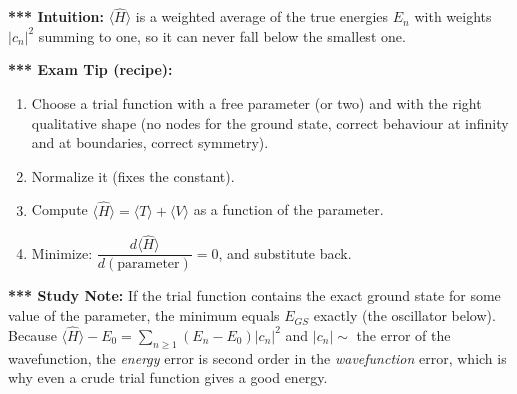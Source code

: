 \documentclass[11pt,a4paper]{article}
\begin{document}
\textbf{*** Intuition:} $\langle\hat H\rangle$ is a weighted average of the true energies $E_n$ with weights $|c_n|^2$ summing to one, so it can never fall below the smallest one.

\textbf{*** Exam Tip (recipe):}
\begin{enumerate}[noitemsep]
    \item Choose a trial function with a free parameter (or two) and with the right qualitative shape (no nodes for the ground state, correct behaviour at infinity and at boundaries, correct symmetry).
    \item Normalize it (fixes the constant).
    \item Compute $\langle\hat H\rangle = \langle T\rangle + \langle V\rangle$ as a function of the parameter.
    \item Minimize: $\dfrac{d\langle\hat H\rangle}{d(\text{parameter})}=0$, and substitute back.
\end{enumerate}
\textbf{*** Study Note:} If the trial function contains the exact ground state for some value of the parameter, the minimum equals $E_{GS}$ exactly (the oscillator below). Because $\langle\hat H\rangle - E_0 = \sum_{n\ge1}(E_n-E_0)|c_n|^2$ and $|c_n|\sim$ the error of the wavefunction, the \textit{energy} error is second order in the \textit{wavefunction} error, which is why even a crude trial function gives a good energy.
\end{document}
